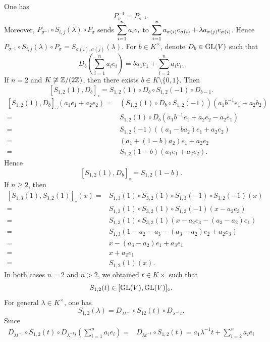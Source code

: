 \begin{proofenv}
    One has
    $$P_{\sigma}^{-1} = P_{\sigma^{-1}}.$$
    Moreover, $P_{\sigma^{-1}} \circ S_{i,j}(\lambda) \circ P_{\sigma}$ sends $\dis \sum_{i=1}^{n}a_i e_i$ to $\dis \sum_{i=1}^{n}a_{\sigma(i)} e_{\sigma(i)} + \lambda a_{\sigma(j)} e_{\sigma(i)}$.
    Hence $P_{\sigma^{-1}} \circ S_{i,j}(\lambda) \circ P_{\sigma} = S_{\sigma(i),\sigma(j)} (\lambda).$
    For $b \in K^\times$, denote $D_b \in \GL(V)$ such that
    $$D_b(\sum_{i=1}^{n}a_ie_i) = b a_1 e_1 + \sum_{i=2}^{n}a_i e_i.$$
    If $n=2$ and $K\not \cong \ZZ/(2\ZZ)$, then there exists $b\in K\setminus\{0,1\}$.
    Then
    $$[S_{1,2}(1), D_{b}]_{\circ} = S_{1,2}(1) \circ D_{b} \circ S_{1,2}(-1) \circ D_{b - 1}.$$
    $$\begin{aligned}
        [S_{1,2}(1), D_{b}]_{\circ} (a_1e_1 + a_2e_2) = & \left(S_{1,2}(1) \circ D_{b} \circ S_{1,2}(-1)\right)\left(a_1 b^{-1} e_1 + a_2 b_2\right)\\
        = & S_{1,2}(1) \circ D_{b} \left(a_1 b^{-1} e_1 + a_2 e_2 - a_2 e_1\right)\\
        = & S_{1,2}(-1) ((a_1 - b a_2) e_1 + a_2 e_2)\\
        = & (a_1 + (1 - b)a_2)e_1 + a_2 e_2\\
        = & S_{1,2}(1 - b) (a_1 e_1 + a_2 e_2).
    \end{aligned}$$
    Hence $$[S_{1,2}(1), D_{b}]_{\circ} = S_{1,2}(1 - b).$$
    If $n \ge 2$, then
    $$\begin{aligned}
        [S_{1,3}(1), S_{3,2}(1)]_{\circ} (x) = & S_{1,3}(1) \circ S_{3,2}(1) \circ S_{1,3}(-1) \circ S_{3,2}(-1)(x)\\
        = & S_{1,3}(1) \circ S_{3,2}(1) \circ S_{1,3}(-1) (x - a_2 e_3)\\
        = & S_{1,3}(1) \circ S_{3,2}(1) (x - a_2 e_3 - (a_3 -a_2)e_1)\\
        = & S_{1,3}(1 - a_2 - a_3 - (a_3 -a_2)e_2 +a_2 e_3)\\
        = & x - (a_3 - a_2) e_1 + a_3 e_1\\
        = & x + a_2 e_1\\
        = & S_{1,2}(1)(x).
    \end{aligned}$$
    In both cases $n = 2$ and $n > 2$, we obtained $t \in K\times$ such that
    $$S_{1,2}(t) \in [\GL(V), \GL(V)]_{\circ}.$$
    For general $\lambda \in K^\times$, one has
    $$S_{1,2}(\lambda) = D_{\lambda t^{-1}} \circ S_{12}(t) \circ D_{\lambda^{-1} t}.$$
    Since
    $$\begin{aligned}
        D_{\lambda t^{-1}} \circ S_{1,2}(t) \circ D_{\lambda^{-1} t} (\sum_{i=1}^{n}a_ie_i) = & D_{\lambda t^{-1}} \circ S_{1,2}(t) = a_1 \lambda^{-1} t + \sum_{i=2}^{n}a_i e_i\\

\end{aligned}$$
\end{proofenv}

